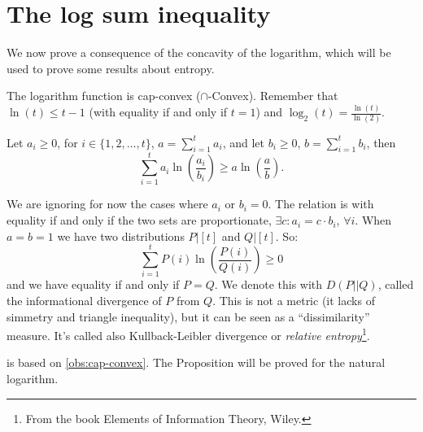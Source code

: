 \chapter{The log sum inequality}

We now prove a consequence of the concavity of the logarithm, which will be used to prove some results about entropy.
\begin{obs}\label{obs:cap-convex}
	The logarithm function is cap-convex ($\cap$-Convex).
	Remember that $\ln(t) \le t - 1$ (with equality if and only if $t=1$) and $\log_2(t) = \frac{\ln(t)}{\ln(2)}$.
\end{obs}

\begin{prop}\label{prop:logsum}
	Let $a_i \ge 0$, for $i \in \{1, 2, \dots, t\}$, $a = \sum_{i = 1}^t a_i$, and let $b_i \ge 0$, $b = \sum_{i = 1}^t b_i$, then 
	\begin{equation*}
		\sum_{i = 1}^t a_i \ln \left( \frac{a_i}{b_i} \right)
		\ge
		a \ln \left( \frac{a}{b} \right).
	\end{equation*}
\end{prop}

We are ignoring for now the cases where $a_i$ or $b_i = 0$.
The relation is with equality if and only if the two sets are proportionate, \ie $\exists c : a_i = c \cdot b_i$, $\forall i$.
When $a = b = 1$ we have two distributions $P|[t]$ and $Q|[t]$.
So:
\begin{equation*}
	\sum_{i = 1}^t P(i) \ln \left( \frac{P(i)}{Q(i)} \right) \ge 0
\end{equation*}
and we have equality if and only if $P = Q$.
We denote this with $D(P||Q)$, called the informational divergence of $P$ from $Q$.
This is not a metric (it lacks of simmetry and triangle inequality), but it can be seen as a ``dissimilarity'' measure.
It's called also Kullback-Leibler divergence or \emph{relative entropy}\footnote{From the book Elements of Information Theory, Wiley.}. 
 
  is based on \cref{obs:cap-convex}.
 The Proposition will be proved for the natural logarithm.
 
